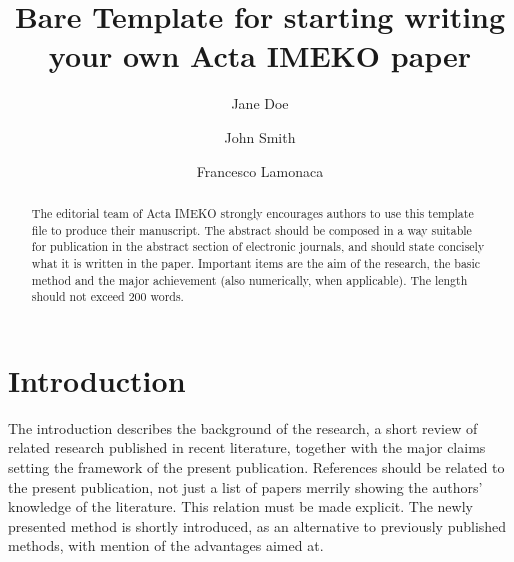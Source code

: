 \documentclass[article]{imeko_acta}
\begin{document}
\title{Bare Template for starting writing your own Acta IMEKO paper} %

\author[1]{Jane Doe}
\author[2]{John Smith}
\author[3,4]{Francesco Lamonaca}






\begin{abstract}
The editorial team of Acta IMEKO strongly encourages 
authors to use this \LaTeXe template file to produce their manuscript. 
The abstract should be composed in a way suitable for publication 
in the abstract section of electronic journals, 
and should state concisely what it is written in the paper. 
Important items are the aim of the research, the basic method and the major achievement 
(also numerically, when applicable). The length should not exceed 200 words.
\end{abstract}

\maketitle %

\section{Introduction}

The introduction describes the background of the research, a 
short review of related research published in recent literature, 
together with the major claims setting the framework of the 
present publication. References should be related to the present 
publication, not just a list of papers merrily showing the authors'
knowledge of the literature. This relation must be made explicit. 
The newly presented method is shortly introduced, as an 
alternative to previously published methods, with mention of the 
advantages aimed at.
\end{document}
